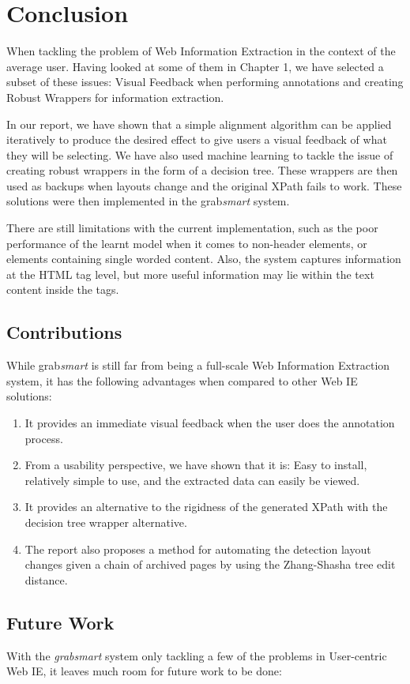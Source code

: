 \chapter{Conclusion}
When tackling the problem of Web Information Extraction in the context of the average user.
Having looked at some of them in Chapter 1, we have selected a subset of these issues:
Visual Feedback when performing annotations and creating Robust Wrappers for information 
extraction.

In our report, we have shown that a simple alignment algorithm can be applied iteratively to
produce the desired effect to give users a visual feedback of what they will be selecting.
We have also used machine learning to tackle the issue of creating robust wrappers in the form
of a decision tree. These wrappers are then used as backups when layouts change and the original
XPath fails to work. These solutions were then implemented in the grab\textit{smart} system.

There are still limitations with the current implementation, such as the poor performance of
the learnt model when it comes to non-header elements, or elements containing single worded
content. Also, the system captures information at the HTML tag level, but more useful information
may lie within the text content inside the tags.

\section{Contributions}
While grab\textit{smart} is still far from being a full-scale Web Information Extraction system,
it has the following advantages when compared to other Web IE solutions:
\begin{enumerate}
	\item It provides an immediate visual feedback when the user does the annotation process.
	\item From a usability perspective, we have shown that it is: Easy to install, relatively
	simple to use, and the extracted data can easily be viewed.
	\item It provides an alternative to the rigidness of the generated XPath with the decision
	tree wrapper alternative.
	\item The report also proposes a method for automating the detection layout changes given
	a chain of archived pages by using the Zhang-Shasha tree edit distance.
\end{enumerate}

\section{Future Work}
With the \textit{grabsmart} system only tackling a few of the problems in User-centric Web IE,
it leaves much room for future work to be done:

